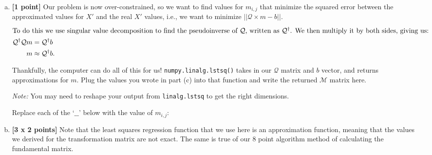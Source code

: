 \begin{enumerate}[(a)]
\item \textbf{[1 point]} Our problem is now over-constrained, so we want to find values for $m_{i,j}$ that minimize the squared error between the approximated values for $X'$ and the real $X'$ values, i.e., we want to minimize $||\mathcal{Q} \times m - b||$. 
\begin{align*}
\intertext{To do this we use singular value decomposition to find the pseudoinverse of $\mathcal{Q}$, written as $\mathcal{Q}^\dagger$. We then multiply it by both sides, giving us:}
 \mathcal{Q}^\dagger \mathcal{Q}m &= \mathcal{Q}^\dagger b\\
 \quad m &\approx \mathcal{Q}^\dagger b.
\end{align*}

Thankfully, the computer can do all of this for us! \texttt{numpy.linalg.lstsq()} takes in our $\mathcal{Q}$ matrix and $b$ vector, and returns approximations for $m$. Plug the values you wrote in part (c) into that function and write the returned $\mathcal{M}$ matrix here.

\textit{Note:} You may need to reshape your output from \texttt{linalg.lstsq} to get the right dimensions.

\begin{tcolorbox}[colback=orange!5!white,colframe=orange!75!black]
Replace each of the `$\_\_$' below with the value of $m_{i, j}$:
\end{tcolorbox}


\item \textbf{[3 x 2 points]} Note that the least squares regression function that we use here is an approximation function, meaning that the values we derived for the transformation matrix are not exact. The same is true of our 8 point algorithm method of calculating the fundamental matrix.


\end{enumerate}
